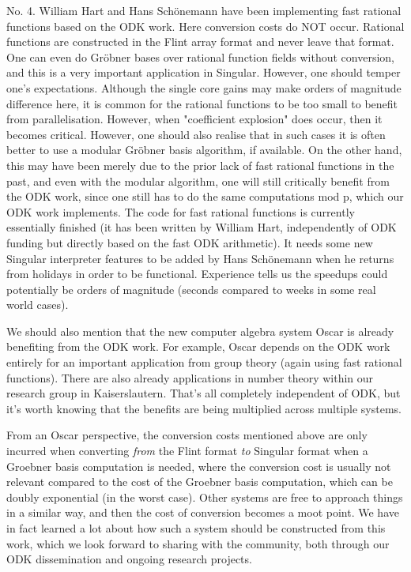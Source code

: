 \documentclass{deliverablereport}
\begin{document}
No. 4. William Hart and Hans Sch\"{o}nemann have been implementing fast rational functions based on the ODK work. Here conversion costs do NOT occur. Rational functions are constructed in the Flint array format and never leave that format. One can even do Gr\"{o}bner bases over rational function fields without conversion, and this is a very important application in Singular. However, one should temper one's expectations. Although the single core gains may make orders of magnitude difference here, it is common for the rational functions to be too small to benefit from parallelisation. However, when "coefficient explosion" does occur, then it becomes critical. However, one should also realise that in such cases it is often better to use a modular Gr\"{o}bner basis algorithm, if available. On the other hand, this may have been merely due to the prior lack of fast rational functions in the past, and even with the modular algorithm, one will still critically benefit from the ODK work, since one still has to do the same computations mod p, which our ODK work implements. The code for fast rational functions is currently essentially finished (it has been written by William Hart, independently of ODK funding but directly based on the fast ODK arithmetic). It needs some new Singular interpreter features to be added by Hans Sch\"{o}nemann when he returns from holidays in order to be functional. Experience tells us the speedups could potentially be orders of magnitude (seconds compared to weeks in some real world cases).

We should also mention that the new computer algebra system Oscar is already benefiting from the ODK work. For example, Oscar depends on the ODK work entirely for an important application from group theory (again using fast rational functions). There are also already applications in number theory within our research group in Kaiserslautern. That's all completely independent of ODK, but it's worth knowing that the benefits are being multiplied across multiple systems.

From an Oscar perspective, the conversion costs mentioned above are only incurred when converting \emph{from} the Flint format \emph{to} Singular format when a Groebner basis computation is needed, where the conversion cost is usually not relevant compared to the cost of the Groebner basis computation, which can be doubly exponential (in the worst case). Other systems are free to approach things in a similar way, and then the cost of conversion becomes a moot point. We have in fact learned a lot about how such a system should be constructed from this work, which we look forward to sharing with the community, both through our ODK dissemination and ongoing research projects.
\end{document}
